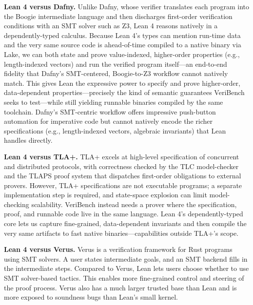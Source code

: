 \documentclass{article}
\begin{document}
\textbf{Lean 4 versus Dafny.}
Unlike Dafny, whose verifier translates each program into the Boogie intermediate language and then discharges first-order verification conditions with an SMT solver such as Z3, Lean 4 reasons natively in a dependently-typed calculus.
Because Lean 4's types can mention run-time data and the very same source code is ahead-of-time compiled to a native binary via Lake, we can both state and prove value-indexed, higher-order properties (e.g., length-indexed vectors) and run the verified program itself---an end-to-end fidelity that Dafny's SMT-centered, Boogie-to-Z3 workflow cannot natively match.
This gives Lean the expressive power to specify and prove higher-order, data-dependent properties—precisely the kind of semantic guarantees VeriBench seeks to test—while still yielding runnable binaries compiled by the same toolchain.
Dafny’s SMT-centric workflow offers impressive push-button automation for imperative code but cannot natively encode the richer specifications (e.g., length-indexed vectors, algebraic invariants) that Lean handles directly.


\textbf{Lean 4 versus TLA+.}
TLA+ excels at high-level specification of concurrent and distributed protocols, with correctness checked by the TLC model-checker and the TLAPS proof system that dispatches first-order obligations to external provers. %
However, TLA+ specifications are not executable programs; a separate implementation step is required, and state-space explosion can limit model-checking scalability.
VeriBench instead needs a prover where the specification, proof, and runnable code live in the same language.
Lean 4’s dependently-typed core lets us capture fine-grained, data-dependent invariants and then compile the very same artifacts to fast native binaries—capabilities outside TLA+’s scope.

\textbf{Lean 4 versus Verus.}
Verus is a verification framework for Rust programs using SMT solvers. A user states intermediate goals, and an SMT backend fills in the intermediate steps. Compared to Verus, Lean lets users choose whether to use SMT solver-based tactics. This enables more fine-grained control and steering of the proof process. Verus also has a much larger trusted base than Lean and is more exposed to soundness bugs than Lean's small kernel.
\end{document}
